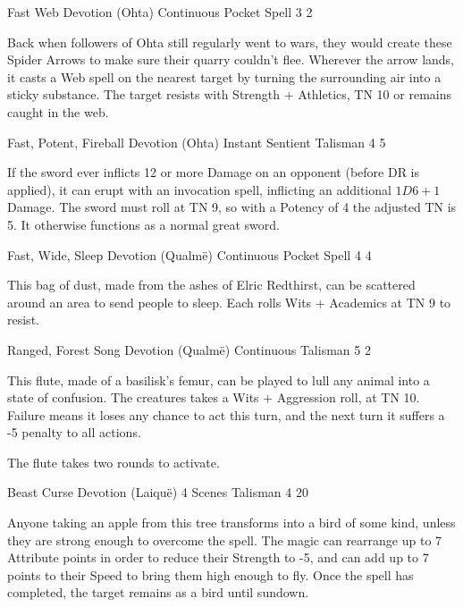 \begin{multicols}{2}
  {Fast Web}%
  {Devotion (Ohta)}%
  {Continuous}%
  {Pocket Spell}%
  {3}%
  {2}%

\label{spiderarrows}

Back when followers of Ohta still regularly went to wars, they would create these Spider Arrows to make sure their quarry couldn't flee.
Wherever the arrow lands, it casts a Web spell on the nearest target by turning the surrounding air into a sticky substance.
The target resists with Strength + Athletics, TN 10 or remains caught in the web.

  {Fast, Potent, Fireball}%
  {Devotion (Ohta)}%
  {Instant}%
  {Sentient Talisman}%
  {4}%
  {5}%
\label{godslayer}

If the sword ever inflicts 12 or more Damage on an opponent (before DR is applied), it can erupt with an invocation spell, inflicting an additional $1D6 + 1$ Damage.
The sword must roll at TN 9, so with a Potency of 4 the adjusted TN is 5.
It otherwise functions as a normal great sword.

  {Fast, Wide, Sleep}%
  {Devotion (Qualm\"e)}%
  {Continuous}%
  {Pocket Spell}%
  {4}%
  {4}%

This bag of dust, made from the ashes of Elric Redthirst, can be scattered around an area to send people to sleep.
Each rolls Wits + Academics at TN 9 to resist.

  {Ranged, Forest Song}%
  {Devotion (Qualm\"e)}%
  {Continuous}%
  {Talisman}%
  {5}%
  {2}%

This flute, made of a basilisk's femur, can be played to lull any animal into a state of confusion.
The creatures takes a Wits + Aggression roll, at TN 10.
Failure means it loses any chance to act this turn, and the next turn it suffers a -5 penalty to all actions.

The flute takes two rounds to activate.

  {Beast Curse}%
  {Devotion (Laiqu\"{e})}%
  {4 Scenes}%
  {Talisman}%
  {4}%
  {20}%

Anyone taking an apple from this tree transforms into a bird of some kind, unless they are strong enough to overcome the spell.
The magic can rearrange up to 7 Attribute points in order to reduce their Strength to -5, and can add up to 7 points to their Speed to bring them high enough to fly.
Once the spell has completed, the target remains as a bird until sundown.


\end{multicols}
